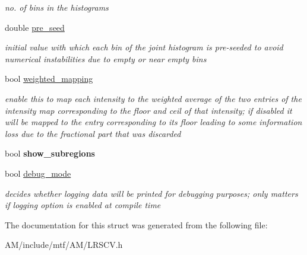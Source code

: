 \begin{DoxyCompactItemize}
\begin{DoxyCompactList}\small\item\em no. of bins in the histograms \end{DoxyCompactList}\item 
\hypertarget{structLRSCVParams_af841b81912dcc95c6e4a33e899126709}{double \hyperlink{structLRSCVParams_af841b81912dcc95c6e4a33e899126709}{pre\-\_\-seed}}\label{structLRSCVParams_af841b81912dcc95c6e4a33e899126709}

\begin{DoxyCompactList}\small\item\em initial value with which each bin of the joint histogram is pre-\/seeded to avoid numerical instabilities due to empty or near empty bins \end{DoxyCompactList}\item 
\hypertarget{structLRSCVParams_a0bf9c1baa18183dcf0fa534cf3cf07ad}{bool \hyperlink{structLRSCVParams_a0bf9c1baa18183dcf0fa534cf3cf07ad}{weighted\-\_\-mapping}}\label{structLRSCVParams_a0bf9c1baa18183dcf0fa534cf3cf07ad}

\begin{DoxyCompactList}\small\item\em enable this to map each intensity to the weighted average of the two entries of the intensity map corresponding to the floor and ceil of that intensity; if disabled it will be mapped to the entry corresponding to its floor leading to some information loss due to the fractional part that was discarded \end{DoxyCompactList}\item 
\hypertarget{structLRSCVParams_a3c7bc336693cc9a792b9b65c4a3b8fd2}{bool {\bfseries show\-\_\-subregions}}\label{structLRSCVParams_a3c7bc336693cc9a792b9b65c4a3b8fd2}

\item 
\hypertarget{structLRSCVParams_af18a4f58ac823d1e9c675b3021b423d4}{bool \hyperlink{structLRSCVParams_af18a4f58ac823d1e9c675b3021b423d4}{debug\-\_\-mode}}\label{structLRSCVParams_af18a4f58ac823d1e9c675b3021b423d4}

\begin{DoxyCompactList}\small\item\em decides whether logging data will be printed for debugging purposes; only matters if logging option is enabled at compile time \end{DoxyCompactList}\end{DoxyCompactItemize}


The documentation for this struct was generated from the following file\-:\begin{DoxyCompactItemize}
\item 
A\-M/include/mtf/\-A\-M/L\-R\-S\-C\-V.\-h\end{DoxyCompactItemize}
